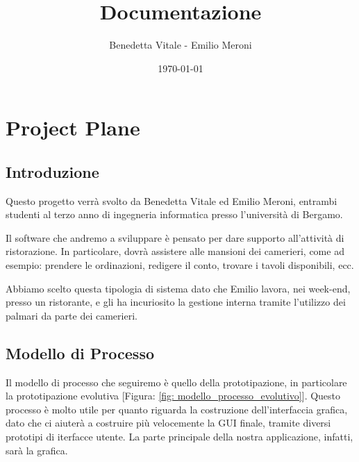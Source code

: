 \documentclass{book}
\title{Documentazione}
\author{Benedetta Vitale - Emilio Meroni}
\date{\today}
\begin{document}
\maketitle

\tableofcontents    

\chapter{Project Plane}

\section{Introduzione}

    Questo progetto verrà svolto da Benedetta Vitale ed Emilio Meroni, entrambi studenti al terzo anno di ingegneria informatica presso l'università di Bergamo.

    Il software che andremo a sviluppare è pensato per dare supporto 
    all'attività di ristorazione. In particolare, dovrà assistere alle mansioni dei camerieri, come ad esempio: prendere le ordinazioni, redigere il conto, trovare i tavoli disponibili, ecc.

    Abbiamo scelto questa tipologia di sistema dato che Emilio lavora, nei week-end, presso un ristorante, e gli ha incuriosito la gestione interna tramite l'utilizzo dei palmari da parte dei camerieri. 
    \begin{tabbing}
    
    \end{tabbing}
    
\section{Modello di Processo}

    Il modello di processo che seguiremo è quello della prototipazione, in particolare la prototipazione evolutiva [Figura: \ref{fig: modello_processo_evolutivo}]. Questo processo è molto utile per quanto riguarda la costruzione dell'interfaccia grafica, dato che ci aiuterà a costruire più velocemente la GUI finale, tramite diversi prototipi di iterfacce utente. La parte principale della nostra applicazione, infatti, sarà la grafica.
\end{document}
